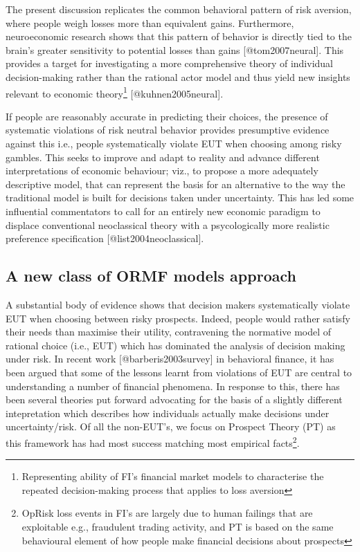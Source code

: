 \documentclass[]{article}
\let\rmarkdownfootnote\footnote%
\def\footnote{\protect\rmarkdownfootnote}
\begin{document}
The present discussion replicates the common behavioral pattern of risk
aversion, where people weigh losses more than equivalent gains.
Furthermore, neuroeconomic research shows that this pattern of behavior
is directly tied to the brain's greater sensitivity to potential losses
than gains {[}@tom2007neural{]}. This provides a target for
investigating a more comprehensive theory of individual decision-making
rather than the rational actor model and thus yield new insights
relevant to economic
theory\footnote{Representing ability of FI's financial market models to characterise the repeated decision-making process that applies to loss aversion}
{[}@kuhnen2005neural{]}.\medskip  

If people are reasonably accurate in predicting their choices, the
presence of systematic violations of risk neutral behavior provides
presumptive evidence against this i.e., people systematically violate
EUT when choosing among risky gambles. This seeks to improve and adapt
to reality and advance different interpretations of economic behaviour;
viz., to propose a more adequately descriptive model, that can represent
the basis for an alternative to the way the traditional model is built
for decisions taken under uncertainty. This has led some influential
commentators to call for an entirely new economic paradigm to displace
conventional neoclassical theory with a psycologically more realistic
preference specification {[}@list2004neoclassical{]}.

\subsection{A new class of ORMF models approach}

A substantial body of evidence shows that decision makers systematically
violate EUT when choosing between risky prospects. Indeed, people would
rather satisfy their needs than maximise their utility, contravening the
normative model of rational choice (i.e., EUT) which has dominated the
analysis of decision making under risk. In recent work
{[}@barberis2003survey{]} in behavioral finance, it has been argued that
some of the lessons learnt from violations of EUT are central to
understanding a number of financial phenomena. In response to this,
there has been several theories put forward advocating for the basis of
a slightly different intepretation which describes how individuals
actually make decisions under uncertainty/risk. Of all the non-EUT's, we
focus on Prospect Theory (PT) as this framework has had most success
matching most empirical
facts\footnote{OpRisk loss events in FI's are largely due to human failings that are exploitable e.g., fraudulent trading activity, and PT is based on the same behavioural element of how people make financial decisions about prospects}.\medskip 
\end{document}
